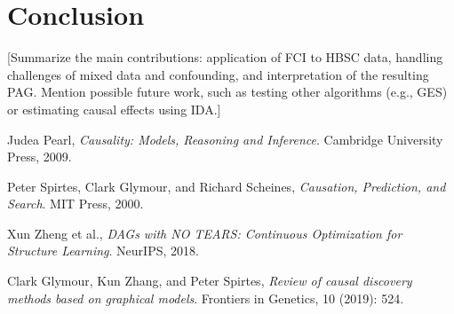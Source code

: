 \documentclass[a4paper]{article}
\begin{document}
\section{Conclusion}
\label{sec:conclusion}

[Summarize the main contributions: application of FCI to HBSC data, handling challenges of mixed data and confounding, and interpretation of the resulting PAG. Mention possible future work, such as testing other algorithms (e.g., GES) or estimating causal effects using IDA.]

\begin{thebibliography}{9}
  Judea Pearl,
  \emph{Causality: Models, Reasoning and Inference}.
  Cambridge University Press, 2009.

  Peter Spirtes, Clark Glymour, and Richard Scheines,
  \emph{Causation, Prediction, and Search}.
  MIT Press, 2000.

  Xun Zheng et al.,
  \emph{DAGs with NO TEARS: Continuous Optimization for Structure Learning}.
  NeurIPS, 2018.

  Clark Glymour, Kun Zhang, and Peter Spirtes,
  \emph{Review of causal discovery methods based on graphical models}.
  Frontiers in Genetics, 10 (2019): 524.
\end{thebibliography}
\end{document}
